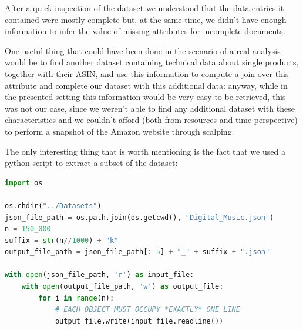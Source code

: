After a quick inspection of the dataset we understood that the data entries it contained were mostly complete but, at the same time, we didn't have enough information to infer the value of missing attributes for incomplete documents.

One useful thing that could have been done in the scenario of a real analysis would be to find another dataset containing technical data about single products, together with their ASIN, and use this information to compute a join over this attribute and complete our dataset with this additional data: anyway, while in the presented setting this information would be very easy to be retrieved, this was not our case, since we weren't able to find any additional dataset with these characteristics and we couldn't afford (both from resources and time perspective) to perform a snapshot of the Amazon website through scalping. 

The only interesting thing that is worth mentioning is the fact that we used a python script to extract a subset of the dataset:\\
\begin{lstlisting}[language=Python]
import os

os.chdir("../Datasets")
json_file_path = os.path.join(os.getcwd(), "Digital_Music.json")
n = 150_000
suffix = str(n//1000) + "k"
output_file_path = json_file_path[:-5] + "_" + suffix + ".json"

with open(json_file_path, 'r') as input_file:
    with open(output_file_path, 'w') as output_file:
        for i in range(n):
            # EACH OBJECT MUST OCCUPY *EXACTLY* ONE LINE
            output_file.write(input_file.readline())
\end{lstlisting}


